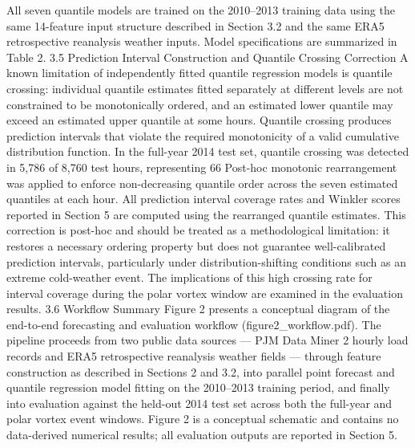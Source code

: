 All seven quantile models are trained on the 2010–2013 training data using the same 14-feature input structure described in Section 3.2 and the same ERA5 retrospective reanalysis weather inputs. Model specifications are summarized in Table 2.
3.5 Prediction Interval Construction and Quantile Crossing Correction
A known limitation of independently fitted quantile regression models is quantile crossing: individual quantile estimates fitted separately at different levels are not constrained to be monotonically ordered, and an estimated lower quantile may exceed an estimated upper quantile at some hours. Quantile crossing produces prediction intervals that violate the required monotonicity of a valid cumulative distribution function.
In the full-year 2014 test set, quantile crossing was detected in 5,786 of 8,760 test hours, representing 66%
Post-hoc monotonic rearrangement was applied to enforce non-decreasing quantile order across the seven estimated quantiles at each hour. All prediction interval coverage rates and Winkler scores reported in Section 5 are computed using the rearranged quantile estimates. This correction is post-hoc and should be treated as a methodological limitation: it restores a necessary ordering property but does not guarantee well-calibrated prediction intervals, particularly under distribution-shifting conditions such as an extreme cold-weather event. The implications of this high crossing rate for interval coverage during the polar vortex window are examined in the evaluation results.
3.6 Workflow Summary
Figure 2 presents a conceptual diagram of the end-to-end forecasting and evaluation workflow (figure2_workflow.pdf). The pipeline proceeds from two public data sources — PJM Data Miner 2 hourly load records and ERA5 retrospective reanalysis weather fields — through feature construction as described in Sections 2 and 3.2, into parallel point forecast and quantile regression model fitting on the 2010–2013 training period, and finally into evaluation against the held-out 2014 test set across both the full-year and polar vortex event windows. Figure 2 is a conceptual schematic and contains no data-derived numerical results; all evaluation outputs are reported in Section 5.